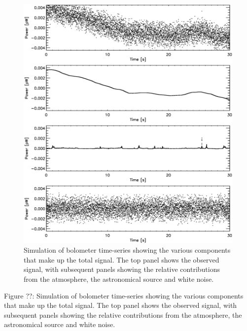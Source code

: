 \documentclass[twoside,11pt]{article}
\newcommand{\htmladdimg}[1]{}
\newenvironment{latexonly}{}{}
\renewcommand{\_}{\texttt{\symbol{95}}}
\begin{document}
\begin{latexonly}
   \begin{figure}[hbt]
   \begin{center}
     \includegraphics[width=150mm]{sun258_signalcpts.eps}
     \caption{Simulation of bolometer time-series showing the various
       components that make up the total signal. The top panel shows
       the observed signal, with subsequent panels showing the
       relative contributions from the atmosphere, the astronomical
       source and white noise.}
     \label{fig:comps}
   \end{center}
   \end{figure}
\end{latexonly}
\begin{htmlonly}
   \label{fig:signal}
   \htmladdimg{sun258_signalcpts.gif}

   Figure ??: Simulation of bolometer time-series showing the various
   components that make up the total signal. The top panel shows the
   observed signal, with subsequent panels showing the relative
   contributions from the atmosphere, the astronomical source and
   white noise.

\end{htmlonly}
\end{document}
